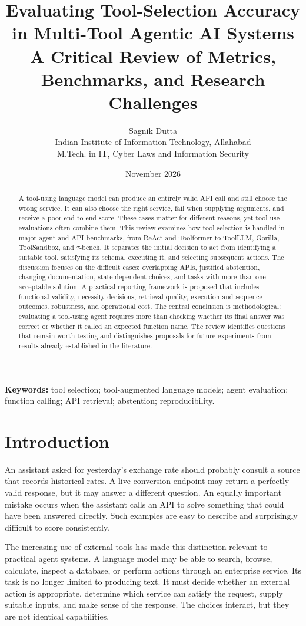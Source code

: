 \documentclass[10pt,a4paper]{article}
\title{Evaluating Tool-Selection Accuracy in Multi-Tool Agentic AI Systems\\\large A Critical Review of Metrics, Benchmarks, and Research Challenges}
\author{Sagnik Dutta\\\small Indian Institute of Information Technology, Allahabad\\\small M.Tech. in IT, Cyber Laws and Information Security}
\date{November 2026}
\begin{document}
\maketitle
\begin{abstract}
A tool-using language model can produce an entirely valid API call and still choose the wrong service. It can also choose the right service, fail when supplying arguments, and receive a poor end-to-end score. These cases matter for different reasons, yet tool-use evaluations often combine them. This review examines how tool selection is handled in major agent and API benchmarks, from ReAct and Toolformer to ToolLLM, Gorilla, ToolSandbox, and $\tau$-bench. It separates the initial decision to act from identifying a suitable tool, satisfying its schema, executing it, and selecting subsequent actions. The discussion focuses on the difficult cases: overlapping APIs, justified abstention, changing documentation, state-dependent choices, and tasks with more than one acceptable solution. A practical reporting framework is proposed that includes functional validity, necessity decisions, retrieval quality, execution and sequence outcomes, robustness, and operational cost. The central conclusion is methodological: evaluating a tool-using agent requires more than checking whether its final answer was correct or whether it called an expected function name. The review identifies questions that remain worth testing and distinguishes proposals for future experiments from results already established in the literature.
\end{abstract}
\noindent\textbf{Keywords:} tool selection; tool-augmented language models; agent evaluation; function calling; API retrieval; abstention; reproducibility.
\section{Introduction}
An assistant asked for yesterday's exchange rate should probably consult a source that records historical rates. A live conversion endpoint may return a perfectly valid response, but it may answer a different question. An equally important mistake occurs when the assistant calls an API to solve something that could have been answered directly. Such examples are easy to describe and surprisingly difficult to score consistently.

The increasing use of external tools has made this distinction relevant to practical agent systems. A language model may be able to search, browse, calculate, inspect a database, or perform actions through an enterprise service. Its task is no longer limited to producing text. It must decide whether an external action is appropriate, determine which service can satisfy the request, supply suitable inputs, and make sense of the response. The choices interact, but they are not identical capabilities.
\end{document}

